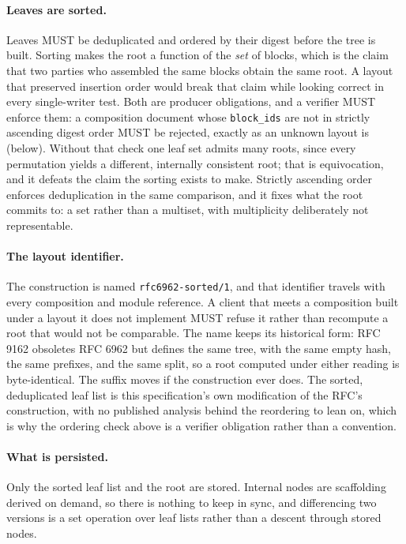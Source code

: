 \documentclass[11pt,a4paper]{article}
\begin{document}
\paragraph{Leaves are sorted.}
Leaves MUST be deduplicated and ordered by their digest before the tree is
built. Sorting makes the root a function of the \emph{set} of blocks, which is
the claim that two parties who assembled the same blocks obtain the same root.
A layout that preserved insertion order would break that claim while looking
correct in every single-writer test. Both are producer obligations, and a
verifier MUST enforce them: a composition document whose \texttt{block\_ids}
are not in strictly ascending digest order MUST be rejected, exactly as an
unknown layout is (below). Without that check one
leaf set admits many roots, since every permutation yields a different,
internally consistent root; that is equivocation, and it defeats the claim the
sorting exists to make. Strictly ascending order enforces deduplication in the
same comparison, and it fixes what the root commits to: a set rather than a
multiset, with multiplicity deliberately not representable.

\paragraph{The layout identifier.}
The construction is named \texttt{rfc6962-sorted/1}, and that identifier travels
with every composition and module reference. A client that meets a composition
built under a layout it does not implement MUST refuse it rather than
recompute a root that would not be comparable. The name keeps its historical form: RFC 9162 obsoletes RFC 6962 but defines
the same tree, with the same empty hash, the same prefixes, and the same
split, so a root computed under either reading is byte-identical. The suffix
moves if the construction ever does. The sorted, deduplicated leaf list is
this specification's own modification of the RFC's construction, with no
published analysis behind the reordering to lean on, which is why the ordering
check above is a verifier obligation rather than a convention.

\paragraph{What is persisted.}
Only the sorted leaf list and the root are stored. Internal nodes are
scaffolding derived on demand, so there is nothing to keep in sync, and
differencing two versions is a set operation over leaf lists rather than a
descent through stored nodes.
\end{document}
